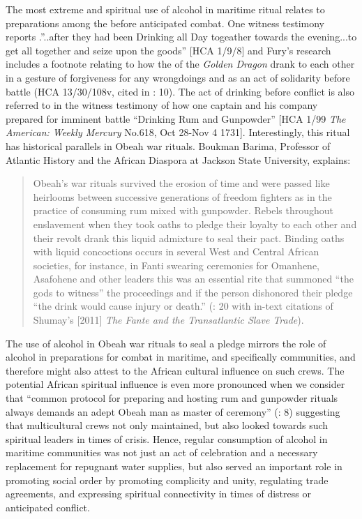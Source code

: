 The most extreme and spiritual use of alcohol in maritime ritual relates to preparations among the  before anticipated combat. One witness testimony reports .”..after they had been Drinking all Day togeather towards the evening...to get all together and seize upon the goods” [HCA 1/9/8] and Fury’s research includes a footnote relating to how the  of the \textit{Golden Dragon} drank to each other in a gesture of forgiveness for any wrongdoings and as an act of solidarity before battle (HCA 13/30/108v, cited in \citealt{Fury2015}: 10). The act of drinking before conflict is also referred to in the witness testimony of how one captain and his company prepared for imminent battle “Drinking Rum and Gunpowder” [HCA 1/99 \textit{The American: Weekly Mercury} No.618, Oct 28-Nov 4 1731]. Interestingly, this ritual has historical parallels in Obeah war rituals. Boukman Barima, Professor of Atlantic History and the African Diaspora at Jackson State University, explains:

\begin{quotation}
Obeah’s war rituals survived the erosion of time and were passed like heirlooms between successive generations of freedom fighters as in the practice of consuming rum mixed with gunpowder. Rebels throughout enslavement when they took oaths to pledge their loyalty to each other and their revolt drank this liquid admixture to seal their pact. Binding oaths with liquid concoctions occurs in several West and Central African societies, for instance, in Fanti swearing ceremonies for Omanhene, Asafohene and other leaders this was an essential rite that summoned “the gods to witness” the proceedings and if the person dishonored their pledge “the drink would cause injury or death.” (\citealt{BoukmanBarima2016}: 20 with in-text citations of Shumay’s [2011] \textit{The Fante and the Transatlantic Slave Trade}).
\end{quotation}

The use of alcohol in Obeah war rituals to seal a pledge mirrors the role of alcohol in preparations for combat in maritime, and specifically  communities, and therefore might also attest to the African cultural influence on such crews. The potential African spiritual influence is even more pronounced when we consider that “common protocol for preparing and hosting rum and gunpowder rituals always demands an adept Obeah man as master of ceremony” (\citealt{BoukmanBarima2016}: 8) suggesting that multicultural crews not only maintained, but also looked towards such spiritual leaders in times of crisis. Hence, regular consumption of alcohol in maritime communities was not just an act of celebration and a necessary replacement for repugnant water supplies, but also served an important role in promoting social order by promoting complicity and unity, regulating trade agreements, and expressing spiritual connectivity in times of distress or anticipated conflict. 

